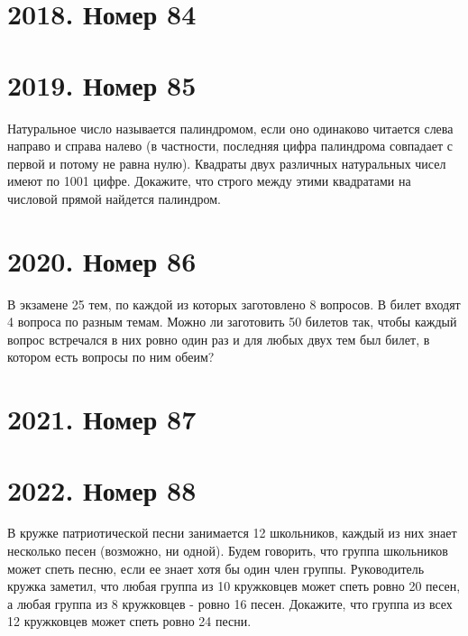 \documentclass[11pt, a4paper]{common/document_template}
\begin{document}
\chapter{2018. Номер 84}




\chapter{2019. Номер 85}

\begin{exercise}
Натуральное число называется палиндромом, если оно одинаково читается слева направо и справа налево (в частности, последняя цифра палиндрома совпадает с первой и потому не равна нулю). Квадраты двух различных натуральных чисел имеют по 1001 цифре. Докажите, что строго между этими квадратами на числовой прямой найдется палиндром.
\end{exercise}

\chapter{2020. Номер 86}


\begin{exercise}
В экзамене 25 тем, по каждой из которых заготовлено 8 вопросов. В билет входят 4 вопроса по разным темам. Можно ли заготовить 50 билетов так, чтобы каждый вопрос встречался в них ровно один раз и для любых двух тем был билет, в котором есть вопросы по ним обеим?
\end{exercise}

\chapter{2021. Номер 87}

\chapter{2022. Номер 88}

\begin{exercise}
В кружке патриотической песни занимается 12 школьников, каждый из них знает несколько песен (возможно, ни одной). Будем говорить, что группа школьников может спеть песню, если ее знает хотя бы один член группы. Руководитель кружка заметил, что любая группа из 10 кружковцев может спеть ровно 20 песен, а любая группа из 8 кружковцев - ровно 16 песен. Докажите, что группа из всех 12 кружковцев может спеть ровно 24 песни.
\end{exercise}
\end{document}
